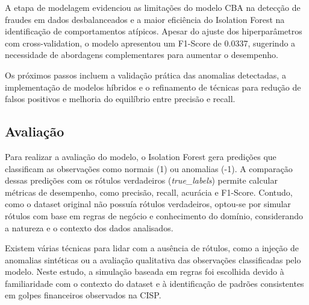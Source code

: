 \documentclass[12pt,a4paper]{article}
\begin{document}
A etapa de modelagem evidenciou as limita\c{c}\~{o}es do modelo CBA na detec\c{c}\~{a}o de fraudes em dados desbalanceados e a maior efici\^encia do Isolation Forest na identifica\c{c}\~{a}o de comportamentos at\'ipicos. Apesar do ajuste dos hiperpar\^ametros com cross-validation, o modelo apresentou um F1-Score de 0.0337, sugerindo a necessidade de abordagens complementares para aumentar o desempenho.

Os pr\'oximos passos incluem a valida\c{c}\~{a}o pr\'atica das anomalias detectadas, a implementa\c{c}\~{a}o de modelos h\'ibridos e o refinamento de t\'ecnicas para redu\c{c}\~{a}o de falsos positivos e melhoria do equil\'ibrio entre precis\~{a}o e recall.

\subsection{Avalia\c{c}\~{a}o}

Para realizar a avalia\c{c}\~{a}o do modelo, o Isolation Forest gera predi\c{c}\~{o}es que classificam as observa\c{c}\~{o}es como normais (1) ou anomalias (-1). A compara\c{c}\~{a}o dessas predi\c{c}\~{o}es com os r\'otulos verdadeiros (\textit{true\_labels}) permite calcular m\'etricas de desempenho, como precis\~{a}o, recall, acur\'acia e F1-Score. Contudo, como o dataset original n\~{a}o possu\'ia r\'otulos verdadeiros, optou-se por simular r\'otulos com base em regras de neg\'ocio e conhecimento do dom\'inio, considerando a natureza e o contexto dos dados analisados.

Existem v\'arias t\'ecnicas para lidar com a aus\^encia de r\'otulos, como a inje\c{c}\~{a}o de anomalias sint\'eticas ou a avalia\c{c}\~{a}o qualitativa das observa\c{c}\~{o}es classificadas pelo modelo. Neste estudo, a simula\c{c}\~{a}o baseada em regras foi escolhida devido \`a familiaridade com o contexto do dataset e \`a identifica\c{c}\~{a}o de padr\~{o}es consistentes em golpes financeiros observados na CISP.
\end{document}
